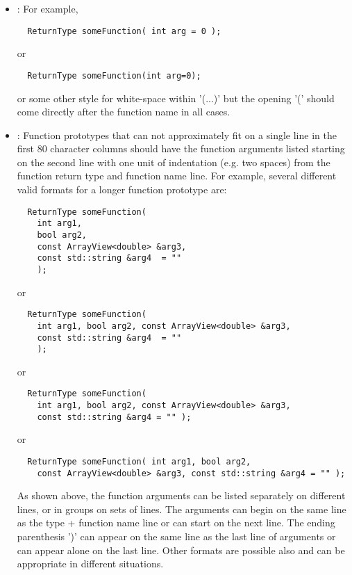 \begin{itemize}
\begin{itemize}
  {}\item\FSCShortFunctionPrototypesOneLine: For example,

  {\small\begin{verbatim}
  ReturnType someFunction( int arg = 0 );
  \end{verbatim}}

  or 

  {\small\begin{verbatim}
  ReturnType someFunction(int arg=0);
  \end{verbatim}}

  or some other style for white-space within '(...)' but the opening '(' should
  come directly after the function name in all cases.

  {}\item\FSCLongFunctionPrototypesIndent: Function prototypes that can not
  approximately fit on a single line in the first 80 character columns should
  have the function arguments listed starting on the second line with one unit
  of indentation (e.g. two spaces) from the function return type and function
  name line.  For example, several different valid formats for a longer
  function prototype are:

  {\small\begin{verbatim}
  ReturnType someFunction(
    int arg1,
    bool arg2,
    const ArrayView<double> &arg3,
    const std::string &arg4  = ""
    );
  \end{verbatim}}
  
  or
  
  {\small\begin{verbatim}
  ReturnType someFunction(
    int arg1, bool arg2, const ArrayView<double> &arg3,
    const std::string &arg4  = ""
    );
  \end{verbatim}}
  
  or
  
  {\small\begin{verbatim}
  ReturnType someFunction(
    int arg1, bool arg2, const ArrayView<double> &arg3,
    const std::string &arg4 = "" );
  \end{verbatim}}
  
  or
  
  {\small\begin{verbatim}
  ReturnType someFunction( int arg1, bool arg2,
    const ArrayView<double> &arg3, const std::string &arg4 = "" );
  \end{verbatim}}

  As shown above, the function arguments can be listed separately on different
  lines, or in groups on sets of lines.  The arguments can begin on the same
  line as the type + function name line or can start on the next line.  The
  ending parenthesis ')' can appear on the same line as the last line of
  arguments or can appear alone on the last line.  Other formats are possible
  also and can be appropriate in different situations.


\end{itemize}
\end{itemize}
